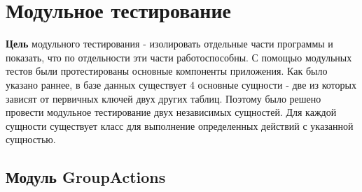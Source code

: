 \chapter{Модульное тестирование}

\textbf{Цель} модульного тестирования - изолировать отдельные части программы и показать, что по отдельности эти части работоспособны.
С помощью модульных тестов были протестированы основные компоненты приложения.
Как было указано раннее, в базе данных существует 4 основные сущности - две из которых зависят от первичных ключей двух других таблиц. Поэтому было решено провести модульное тестирование двух независимых сущностей. Для каждой сущности существует класс для выполнение определенных действий с указанной сущностью. 
\section{Модуль GroupActions}

